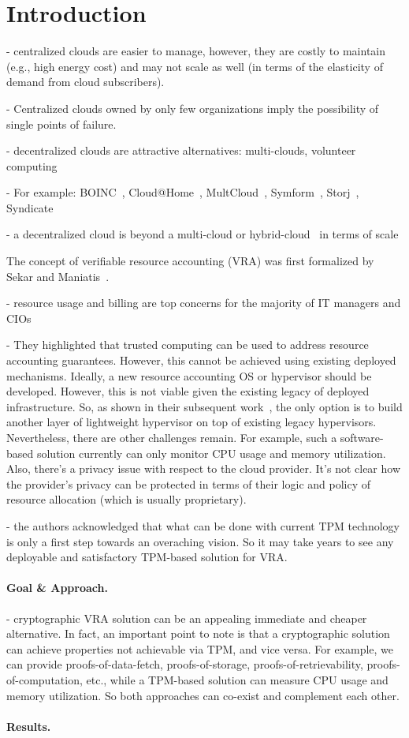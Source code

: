 \section{Introduction} \label{sect:intro}

- centralized clouds are easier to manage, however, they are costly to maintain (e.g., high energy cost) and may not scale as well (in terms of the elasticity of demand from cloud subscribers).

- Centralized clouds owned by only few organizations imply the possibility of single points of failure.

- decentralized clouds are attractive alternatives: multi-clouds, volunteer computing

- For example: BOINC~\cite{BOINC}, Cloud@Home~\cite{DP12}, MultCloud~\cite{MultCloud}, Symform~\cite{Symform}, Storj~\cite{Storj}, Syndicate~\cite{Syndicate}

- a decentralized cloud is beyond a multi-cloud or hybrid-cloud~\cite{ZHA+12,EK13} in terms of scale

The concept of verifiable resource accounting (VRA) was first formalized by Sekar and Maniatis~\cite{SM11}.

- resource usage and billing are top concerns for the majority of IT managers and CIOs 

- They highlighted that trusted computing can be used to address resource accounting guarantees. However, this cannot be achieved using existing deployed mechanisms. Ideally, a new resource accounting OS or hypervisor should be developed. However, this is not viable given the existing legacy of deployed infrastructure. So, as shown in their subsequent work~\cite{CMP+13}, the only option is to build another layer of lightweight hypervisor on top of existing legacy hypervisors. Nevertheless, there are other challenges remain. For example, such a software-based solution currently can only monitor CPU usage and memory utilization. Also, there's a privacy issue with respect to the cloud provider. It's not clear how the provider's privacy can be protected in terms of their logic and policy of resource allocation (which is usually proprietary).

- the authors acknowledged that what can be done with current TPM technology is only a first step towards an overaching vision. So it may take years to see any deployable and satisfactory TPM-based solution for VRA.


\paragraph{Goal \& Approach.}
- cryptographic VRA solution can be an appealing immediate and cheaper alternative. In fact, an important point to note is that a cryptographic solution can achieve properties not achievable via TPM, and vice versa. For example, we can provide proofs-of-data-fetch, proofs-of-storage, proofs-of-retrievability, proofs-of-computation, etc., while a TPM-based solution can measure CPU usage and memory utilization. So both approaches can co-exist and complement each other.


\paragraph{Results.}


